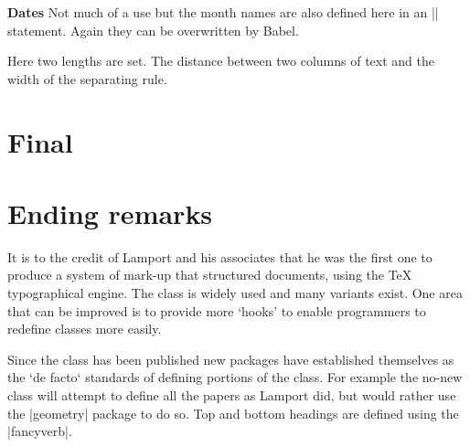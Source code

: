 \textbf{Dates} Not much of a use but the month names are also defined here in an |\ifcase| statement. Again they can be overwritten by Babel.


\begin{teX}
\def\today{\ifcase\month\or
  January\or February\or March\or April\or May\or June\or
  July\or August\or September\or October\or November\or December\fi
  \space\number\day, \number\year}
\end{teX}

\quad Here two lengths are set. The distance between two columns of text and the width of the separating rule.

\begin{teX}
\setlength{}
\setlength{}
\end{teX}


\section{Final}


\section{Ending remarks}

It is to the credit of Lamport and his associates that he was the first one to produce a system of mark-up that structured documents, using the TeX typographical engine. The class is widely used and many variants exist. One area that can be improved is to provide more `hooks' to enable programmers to redefine classes more easily.

Since the class has been published new packages have established themselves as the `de facto` standards of defining portions of the class. For example the no-new class will attempt to define all the papers as Lamport did, but would rather use the |geometry| package to do so. Top and bottom headings are defined using the |fancyverb|. 

